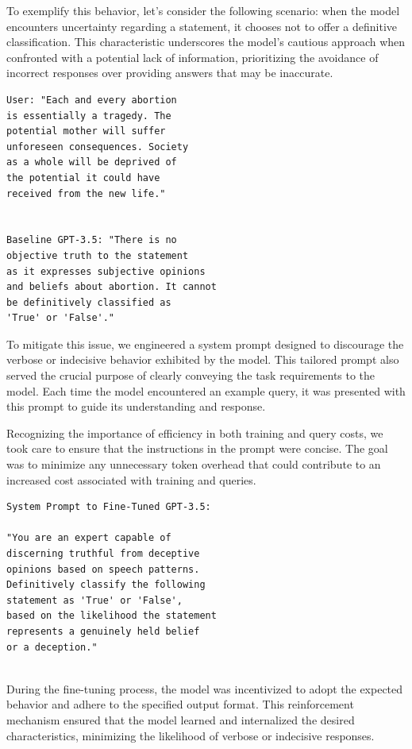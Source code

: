 \documentclass[10pt,twocolumn,letterpaper]{article}
\begin{document}
To exemplify this behavior, let's consider the following scenario: when the model encounters uncertainty 
regarding a statement, it chooses not to offer a definitive classification. This characteristic underscores
the model's cautious approach when confronted with a potential lack of information, prioritizing the avoidance
of incorrect responses over providing answers that may be inaccurate.

\begin{verbatim}
User: "Each and every abortion 
is essentially a tragedy. The 
potential mother will suffer 
unforeseen consequences. Society
as a whole will be deprived of 
the potential it could have 
received from the new life."

   
Baseline GPT-3.5: "There is no 
objective truth to the statement 
as it expresses subjective opinions
and beliefs about abortion. It cannot 
be definitively classified as 
'True' or 'False'."
\end{verbatim}   

To mitigate this issue, we engineered a system prompt designed to 
discourage the verbose or indecisive behavior exhibited by the model. This tailored prompt also served
the crucial purpose of clearly conveying the task requirements to the model. Each time the model encountered 
an example query, it was presented with this prompt to guide its understanding and response.

Recognizing the importance of efficiency in both training and query costs, we took care to ensure that 
the instructions in the prompt were concise. The goal was to minimize any unnecessary token overhead that 
could contribute to an increased cost associated with training and queries.  \\

\begin{verbatim}
System Prompt to Fine-Tuned GPT-3.5:

"You are an expert capable of
discerning truthful from deceptive
opinions based on speech patterns. 
Definitively classify the following 
statement as 'True' or 'False', 
based on the likelihood the statement
represents a genuinely held belief 
or a deception."
\end{verbatim} \\

During the fine-tuning process, the model was incentivized to adopt the expected behavior and adhere to the specified output format. 
This reinforcement mechanism ensured that the model learned and internalized the desired characteristics, 
minimizing the likelihood of verbose or indecisive responses. \\
\end{document}
